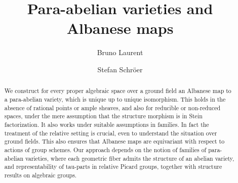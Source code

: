 \documentclass[oneside, 12pt]{amsart}
\theoremstyle{definition}
\theoremstyle{remark}
\begin{document}
\title[Para-abelian varieties and  Albanese maps]
      {Para-abelian varieties and  Albanese maps}

\author[Bruno Laurent]{Bruno Laurent}
\address{Heinrich Heine University D\"usseldorf, Faculty of Mathematics and Natural Sciences, Mathematical Institut,
40204 D\"usseldorf, Germany}
\curraddr{}

\author[Stefan Schr\"oer]{Stefan Schr\"oer}
\address{Heinrich Heine University D\"usseldorf, Faculty of Mathematics and Natural Sciences, Mathematical Institut,
40204 D\"usseldorf, Germany}
\curraddr{}






\begin{abstract}
We construct for every proper algebraic space over a ground field   an Albanese map to
a para-abelian variety, which is unique up to unique isomorphism. 
This holds   in the absence of rational points or ample sheaves,
and also for reducible or non-reduced spaces, under the mere assumption that the
structure morphism is in Stein factorization.
It also works under suitable assumptions in families. In fact  the treatment of the relative setting is crucial, 
even to understand the situation over ground fields. This also ensures that Albanese maps are equivariant with respect to actions of  group schemes.
Our approach depends on the notion of families of para-abelian varieties, where each geometric fiber   admits the  structure of an abelian variety, 
and   representability of   tau-parts in relative Picard groups, together with structure results on algebraic groups.
\end{abstract}
 
\maketitle
\tableofcontents

\newcommand{\dvs}{\text{\rm{dvs}}}
\newcommand{\prj}{\text{\rm{prj}}}
\newcommand{\afp}{\text{\rm{afp}}}
\newcommand{\trs}{\text{\rm{trs}}}
\newcommand{\abl}{\text{\rm{abl}}}
\end{document}
